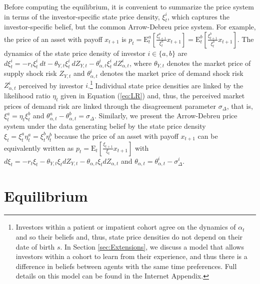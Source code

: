\documentclass[preprint,11pt,authoryear]{elsarticle}
\theoremstyle{plain}
\begin{document}
Before computing the equilibrium, it is convenient to summarize the price system in terms of the investor-specific state price density, $\xi^i_{t}$, which captures the investor-specific belief, but the common Arrow-Debreu price system. For example, the price of an asset with payoff $x_{t+1}$ is $p_t = \mathrm{E}^a_t \left [ \frac{ \xi^a_{t+1}}{\xi^a_t} x_{t+1} \right] = \mathrm{E}^b_t \left [ \frac{ \xi^b_{t+1}}{\xi^b_t} x_{t+1} \right].$ 
The dynamics of the state price density of investor $i \in \{ a, b \}$ are $d\xi^i_{t}  =  - r_t \xi^i_t \: dt - \theta_{Y,t} \xi^i_t  \: dZ_{Y,t} - \theta^i_{\alpha,t} \xi^i_t\: dZ^i_{\alpha,t}$,  
where $\theta_{Y,t}$ denotes the market price of supply shock risk $Z_{Y,t}$ and $\theta^i_{\alpha,t}$ denotes the market price of demand shock risk $Z^i_{\alpha,t}$ perceived by investor $i$.\footnote{Investors within a patient or impatient cohort agree on the dynamics of $\alpha_t$ and so their beliefs and, thus,  state price densities do not depend on their date of birth $s$. In Section \ref{sec:Extensions}, we discuss a model that allows investors within a cohort to learn from their experience, and thus there is a difference in beliefs between agents with the same time preferences. Full details on this model can be found in the Internet Appendix.} %
Individual state price densities are linked by the likelihood ratio $\eta_t$ given in Equation (\ref{eq:LR}) and, thus, the perceived market prices of demand risk are linked through the disagreement parameter $\sigma_{\Delta}$, that is, $\xi^a_t = \eta_t \xi^b_t$ and $\theta^a_{\alpha,t}- \theta^b_{\alpha,t} = \sigma_{\Delta}$. Similarly, we present the Arrow-Debreu price system under the data generating belief by the state price density $\xi_t = \xi_t^a \eta_t^a = \xi_t^b \eta_t^b$ because the price of an asset with payoff $x_{t+1}$  can be equivalently written as $p_t = \mathrm{E}_t \left [ \frac{ \xi_{t+1}}{\xi_t} x_{t+1} \right]$ with $d\xi_{t} =  -r_t\xi_t - \theta_{Y,t}\xi_t dZ_{Y,t}- \theta_{\alpha,t}\xi_t dZ_{\alpha,t}$ and $\theta_{\alpha,t}  = \theta^i_{\alpha,t} - \sigma_{\Delta}^{i}$.

\section{Equilibrium}\label{sec:solution}
\end{document}
